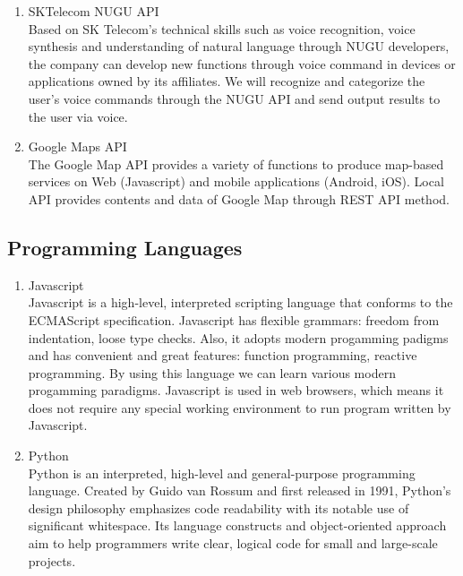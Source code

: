 \documentclass[conference]{IEEEtran}
\begin{document}
\begin{enumerate}
    \item SKTelecom NUGU API\\
    Based on SK Telecom’s technical skills such as voice recognition, voice synthesis and understanding of natural language through NUGU developers, the company can develop new functions through voice command in devices or applications owned by its affiliates. We will recognize and categorize the user’s voice commands through the NUGU API and send output results to the user via voice.\\
    
    \item Google Maps API\\
    The Google Map API provides a variety of functions to produce map-based services on Web (Javascript) and mobile applications (Android, iOS). Local API provides contents and data of Google Map through REST API method.  
\end{enumerate}

\subsection{Programming Languages}
\begin{enumerate}
    \item Javascript\\
    Javascript is a high-level, interpreted scripting language that conforms to the ECMAScript specification. Javascript has flexible grammars: freedom from indentation, loose type checks. Also, it adopts modern progamming padigms and has convenient and great features: function programming, reactive programming. By using this language we can learn various modern progamming paradigms. Javascript is used in web browsers, which means it does not require any special working environment to run program written by Javascript.\\
    
    \item Python\\
    Python is an interpreted, high-level and general-purpose programming language. Created by Guido van Rossum and first released in 1991, Python's design philosophy emphasizes code readability with its notable use of significant whitespace. Its language constructs and object-oriented approach aim to help programmers write clear, logical code for small and large-scale projects.\\
\end{enumerate}
\end{document}
